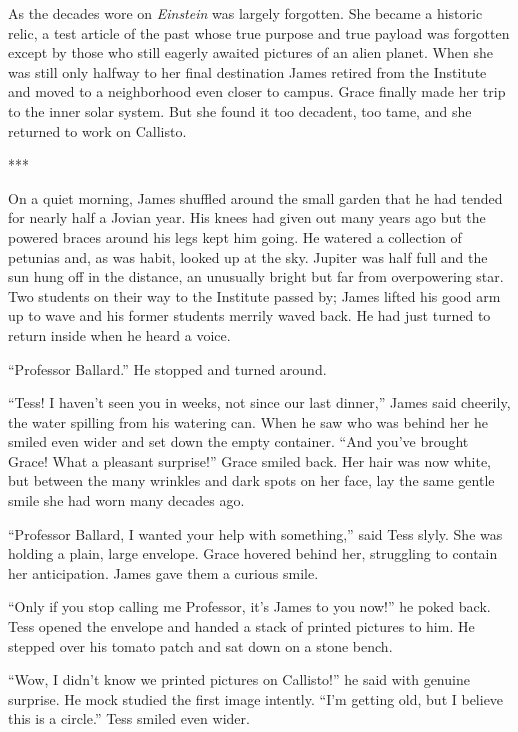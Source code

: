 \documentclass[openany, 12pt]{book} %
\begin{document}
As the decades wore on \textit{Einstein} was largely forgotten. She became a historic relic, a test article of the past whose true purpose and true payload was forgotten except by those who still eagerly awaited pictures of an alien planet. When she was still only halfway to her final destination James retired from the Institute and moved to a neighborhood even closer to campus. Grace finally made her trip to the inner solar system. But she found it too decadent, too tame, and she returned to work on Callisto.

\begin{center}
***
\end{center}

On a quiet morning, James shuffled around the small garden that he had tended for nearly half a Jovian year. His knees had given out many years ago but the powered braces around his legs kept him going. He watered a collection of petunias and, as was habit, looked up at the sky. Jupiter was half full and the sun hung off in the distance, an unusually bright but far from overpowering star. Two students on their way to the Institute passed by; James lifted his good arm up to wave and his former students merrily waved back. He had just turned to return inside when he heard a voice.

``Professor Ballard.'' He stopped and turned around.

``Tess! I haven't seen you in weeks, not since our last dinner,'' James said cheerily, the water spilling from his watering can. When he saw who was behind her he smiled even wider and set down the empty container. ``And you've brought Grace! What a pleasant surprise!'' Grace smiled back. Her hair was now white, but between the many wrinkles and dark spots on her face, lay the same gentle smile she had worn many decades ago. 

``Professor Ballard, I wanted your help with something,'' said Tess slyly. She was holding a plain, large envelope. Grace hovered behind her, struggling to contain her anticipation. James gave them a curious smile.

``Only if you stop calling me Professor, it's James to you now!'' he poked back. Tess opened the envelope and handed a stack of printed pictures to him. He stepped over his tomato patch and sat down on a stone bench.

``Wow, I didn't know we printed pictures on Callisto!'' he said with genuine surprise. He mock studied the first image intently. ``I'm getting old, but I believe this is a circle.'' Tess smiled even wider.
\end{document}
